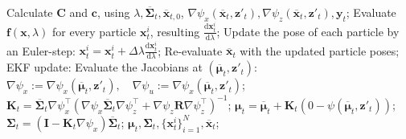 \begin{algorithm}
\begin{algorithmic}[1]
        \State Calculate $\mathbf{C}$ and $\mathbf{c}$, using
        $\lambda,\overline{\boldsymbol\Sigma}_t, \overline{\mathbf{x}}_{t,0}$,
        $\nabla\psi_x(\overline{\mathbf{x}}_t,\mathbf{z}'_t),\nabla\psi_z(\overline{\mathbf{x}}_t,\mathbf{z}'_t), \mathbf{y}_t$;
        \Comment{\eqref{eq:edh-C-impl}-\eqref{eq:edh-c-impl}}
        \State Evaluate $\mathbf{f}(\mathbf{x},\lambda)$ for every particle $\mathbf{x}_t^{i}$, resulting $\frac{\mathrm{d}\mathbf{x}_t^i}{\mathrm{d}\lambda}$;
        \Comment{\eqref{eq:edh-flow-vector}}
        \State Update the pose of each particle by an Euler-step:
        \State\indent $\mathbf{x}_t^{i} = \mathbf{x}_t^{i} + \Delta\lambda\frac{\mathrm{d}\mathbf{x}_t^i}{\mathrm{d}\lambda}$;
        \State Re-evaluate $\overline{\mathbf{x}}_t$ with the updated particle poses;
        \EndFor
        \State EKF update:
        \State\indent Evaluate the Jacobians at $(\overline{\boldsymbol{\mu}}_t,\mathbf{z}'_t)$:
        \Comment{\eqref{eq:motmodel-jacobi-x}-\eqref{eq:motmodel-jacobi-u}}
        \State\indent\indent $\nabla\psi_x := \nabla\psi_x(\overline{\boldsymbol{\mu}}_t,\mathbf{z}'_t), \quad \nabla\psi_u := \nabla\psi_x(\overline{\boldsymbol{\mu}}_t,\mathbf{z}'_t)$;
        \State\indent $\mathbf{K}_t = \overline{\mathbf{\Sigma}}_t\nabla \psi_x^\top\left(\nabla \psi_x\overline{\mathbf{\Sigma}}_t\nabla \psi_z^\top+
            \nabla \psi_z\mathbf{R}\nabla \psi^{\top}_z\right)^{-1}$;
        \State\indent $\boldsymbol{\mu}_t = \overline{\boldsymbol{\mu}}_t + \mathbf{K}_t\left(0-\psi(\overline{\boldsymbol{\mu}}_t,\mathbf{z}'_t)\right)$;
        \Comment{\eqref{eq:observation-function}}
        \State\indent $\mathbf{\Sigma}_t = \left(\mathbf{I}-\mathbf{K}_t\nabla \psi_x\right)\overline{\mathbf{\Sigma}}_t$;
        \State\Return $\boldsymbol{\mu}_t,\boldsymbol{\Sigma}_t,\{\mathbf{x}_t^i\}_{i=1}^{N},\overline{\mathbf{x}}_t$;
    \end{algorithmic}
\end{algorithm}

